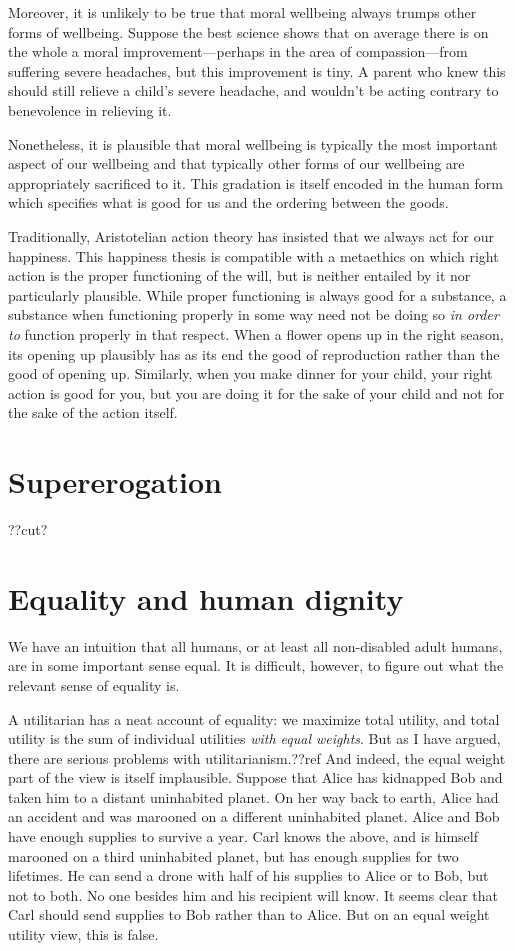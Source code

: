 Moreover, it is unlikely to be true that moral wellbeing always trumps other forms of wellbeing. Suppose the best science shows that on average
there is on the whole a moral improvement---perhaps in the area of compassion---from suffering severe headaches, but this improvement is tiny.
A parent who knew this should still relieve a child's severe headache, and wouldn't be acting contrary to benevolence in relieving it.

Nonetheless, it is plausible that moral wellbeing is typically the most important aspect of our wellbeing and that typically other forms
of our wellbeing are appropriately sacrificed to it. This gradation is itself encoded in the human form which specifies what is good for
us and the ordering between the goods.

Traditionally, Aristotelian action theory has insisted that we always act for our happiness. This happiness thesis is compatible with a metaethics on
which right action is the proper functioning of the will, but is neither entailed by it nor particularly plausible. While proper functioning is always
good for a substance, a substance when functioning properly in some way need not be doing so \textit{in order to} function properly in that respect.
When a flower opens up in the right season, its opening up plausibly has as its end the good of reproduction rather than the good of opening up.
Similarly, when you make dinner for your child, your right action is good for you, but you are doing it for the sake of your child and not for
the sake of the action itself.

\section{Supererogation}
??cut?

\section{Equality and human dignity}
We have an intuition that all humans, or at least all non-disabled adult humans, are in some important sense 
equal. It is difficult, however, to figure out what the relevant sense of equality is. 

A utilitarian has a neat account of equality: we maximize total utility, and total utility is the sum of
individual utilities \textit{with equal weights}. But as I have argued, there are serious problems with
utilitarianism.??ref And indeed, the equal weight part of the view is itself implausible. Suppose that 
Alice has kidnapped Bob and taken him to a distant uninhabited planet. On her way back to earth, Alice 
had an accident and was marooned on a different uninhabited planet. Alice and Bob have enough supplies to
survive a year. Carl knows the above, and is himself marooned on a third uninhabited planet, but has enough 
supplies for two lifetimes. He can send a drone with half of his supplies to Alice or to Bob, but not to
both. No one besides him and his recipient will know. It seems clear that Carl should send supplies to
Bob rather than to Alice. But on an equal weight utility view, this is false.

